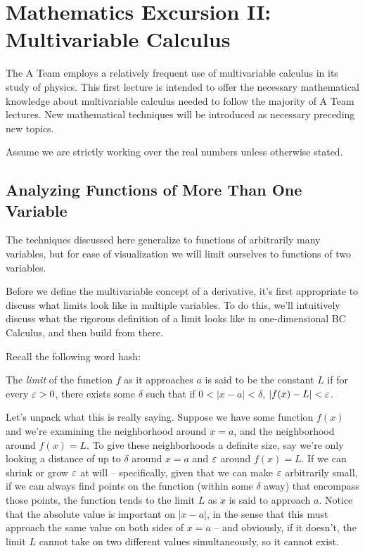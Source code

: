 \section{Mathematics Excursion II: Multivariable Calculus}

The A Team employs a relatively frequent use of multivariable calculus in its study of physics. This first lecture is intended to offer the necessary mathematical knowledge about multivariable calculus needed to follow the majority of A Team lectures. New mathematical techniques will be introduced as necessary preceding new topics. 

Assume we are strictly working over the real numbers unless otherwise stated. 

\subsection{Analyzing Functions of More Than One Variable}
The techniques discussed here generalize to functions of arbitrarily many variables, but for ease of visualization we will limit ourselves to functions of two variables. 

Before we define the multivariable concept of a derivative, it's first appropriate to discuss what limits look like in multiple variables. To do this, we'll intuitively discuss what the rigorous definition of a limit looks like in one-dimensional BC Calculus, and then build from there. 

Recall the following word hash: 
\begin{theorem}
The \textit{limit} of the function $f$ as it approaches $a$ is said to be the constant $L$ if for every $\varepsilon > 0$, there exists some $\delta$ such that if $0 < |x-a| < \delta$, $|f(x) - L| < \varepsilon$. 
\end{theorem}

Let's unpack what this is really saying. Suppose we have some function $f(x)$ and we're examining the neighborhood around $x=a$, and the neighborhood around $f(x) = L$. To give these neighborhoods a definite size, say we're only looking a distance of up to $\delta$ around $x=a$ and $\varepsilon$ around $f(x) = L$. If we can shrink or grow $\varepsilon$ at will -- specifically, given that we can make $\varepsilon$ arbitrarily small, if we can always find points on the function (within some $\delta$ away) that encompass those points, the function tends to the limit $L$ as $x$ is said to approach $a$. Notice that the absolute value is important on $|x-a|$, in the sense that this must approach the same value on both sides of $x = a$ -- and obviously, if it doesn't, the limit $L$ cannot take on two different values simultaneously, so it cannot exist. 

